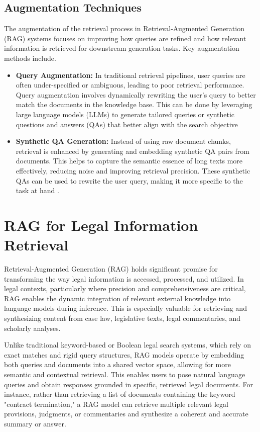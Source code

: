 \subsection{ Augmentation Techniques}
The augmentation of the retrieval process in Retrieval-Augmented Generation (RAG) systems focuses on improving how queries are refined and how relevant information is retrieved for downstream generation tasks. Key augmentation methods include.
\begin{itemize}
	\item \textbf{Query Augmentation:} In traditional retrieval pipelines, user queries are often under-specified or ambiguous, leading to poor retrieval performance. Query augmentation involves dynamically rewriting the user's query to better match the documents in the knowledge base. This can be done by leveraging large language models (LLMs) to generate tailored queries or synthetic questions and answers (QAs) that better align with the search objective​
	\item \textbf{Synthetic QA Generation:} Instead of using raw document chunks, retrieval is enhanced by generating and embedding synthetic QA pairs from documents. This helps to capture the semantic essence of long texts more effectively, reducing noise and improving retrieval precision. These synthetic QAs can be used to rewrite the user query, making it more specific to the task at hand \cite{mombaerts2024meta}.
\end{itemize}
\section{RAG for Legal Information Retrieval}

Retrieval-Augmented Generation (RAG) holds significant promise for transforming the way legal information is accessed, processed, and utilized. In legal contexts, particularly where precision and comprehensiveness are critical, RAG enables the dynamic integration of relevant external knowledge into language models during inference. This is especially valuable for retrieving and synthesizing content from case law, legislative texts, legal commentaries, and scholarly analyses\cite{lexemoRAG}.

Unlike traditional keyword-based or Boolean legal search systems, which rely on exact matches and rigid query structures, RAG models operate by embedding both queries and documents into a shared vector space, allowing for more semantic and contextual retrieval. This enables users to pose natural language queries and obtain responses grounded in specific, retrieved legal documents. For instance, rather than retrieving a list of documents containing the keyword "contract termination," a RAG model can retrieve multiple relevant legal provisions, judgments, or commentaries and synthesize a coherent and accurate summary or answer.

